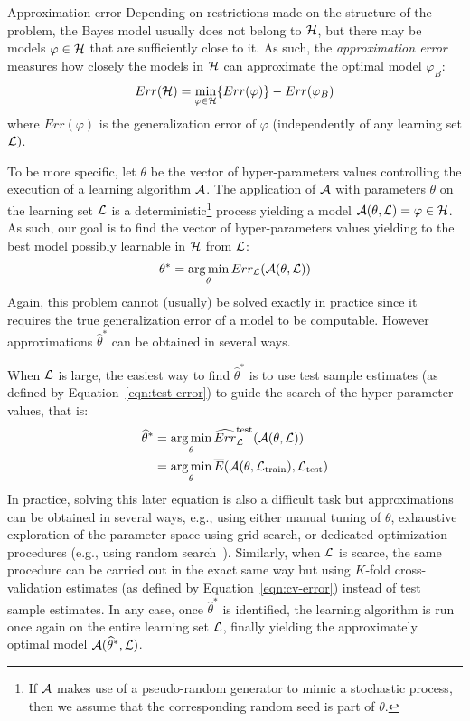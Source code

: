 \begin{remark}{Approximation error}
Depending on restrictions made on the structure of the problem, the
Bayes model usually does not belong to ${\cal H}$, but there may be models
$\varphi \in {\cal H}$ that are sufficiently close to it. As such, the
\textit{approximation error}~\citep{bottou:2011} measures how closely the
models in ${\cal H}$ can approximate the optimal model $\varphi_B$:
\begin{equation}
Err({\cal H}) = \min_{\varphi \in {\cal H}} \{ Err(\varphi) \} - Err(\varphi_B)
\end{equation}
where $Err(\varphi)$ is the generalization error of $\varphi$ (independently
of any learning set ${\cal L})$.
\end{remark}

To be more specific, let $\theta$ be the vector of hyper-parameters values
controlling the execution of a learning algorithm ${\cal A}$. The application
of ${\cal A}$ with parameters $\theta$ on the learning set ${\cal L}$ is a
deterministic\footnote{If ${\cal A}$ makes use of a pseudo-random generator to
mimic a stochastic process, then we assume that the corresponding random seed is
part of $\theta$.} process yielding a model ${\cal A}(\theta, {\cal L}) =
\varphi \in {\cal H}$. As such, our goal is to find the vector of hyper-parameters values
yielding to the best model possibly learnable in ${\cal H}$ from ${\cal L}$:
\begin{equation}
\theta^* = \operatorname*{arg\,min}_{\theta} Err_{\cal L}({\cal A}(\theta, {\cal L}))
\end{equation}
Again, this problem cannot (usually) be solved exactly in practice since
it requires the true generalization error of a model to be computable. However
approximations $\widehat{\theta}^*$ can be obtained in several ways.

When ${\cal L}$ is large, the easiest way to find $\widehat{\theta}^*$ is to
use test sample estimates (as defined by Equation~\ref{eqn:test-error}) to
guide the search of the hyper-parameter values, that is:
\begin{align}
\widehat{\theta}^* &= \operatorname*{arg\,min}_{\theta} \widehat{Err}^\text{test}_{\cal L}({\cal A}(\theta, {\cal L})) \\
                   &= \operatorname*{arg\,min}_{\theta} \overline{E}({\cal A}(\theta, {\cal L}_\text{train}), {\cal L}_\text{test})
\end{align}
In practice, solving this later equation is also a difficult task but
approximations can be obtained in several ways, e.g., using either manual
tuning of $\theta$, exhaustive exploration of the parameter space using grid
search, or dedicated optimization procedures (e.g., using random
search~\citep{bergstra:2012}). Similarly, when ${\cal L}$ is scarce, the same
procedure can be carried out in the exact same way but using $K$-fold
cross-validation estimates (as defined by Equation~\ref{eqn:cv-error}) instead of test sample
estimates. In any case, once $\widehat{\theta}^*$ is identified, the learning
algorithm is run once again on the entire learning set ${\cal L}$, finally
yielding the approximately optimal model ${\cal A}(\widehat{\theta}^*, {\cal
L})$.

